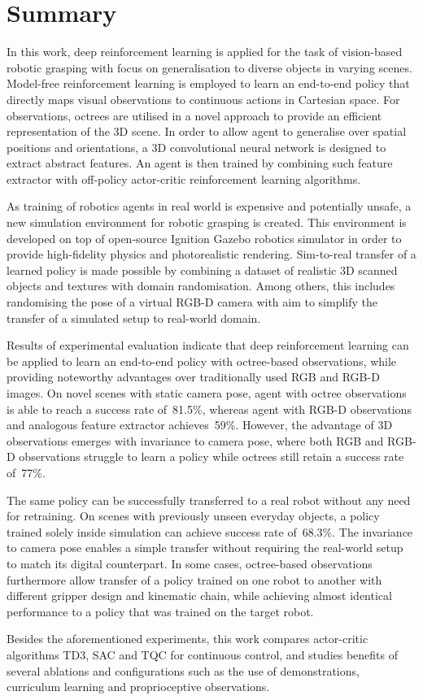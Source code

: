 \chapter*{Summary}

In this work, deep reinforcement learning is applied for the task of vision-based robotic grasping with focus on generalisation to diverse objects in varying scenes. Model-free reinforcement learning is employed to learn an end-to-end policy that directly maps visual observations to continuous actions in Cartesian space. For observations, octrees are utilised in a novel approach to provide an efficient representation of the 3D scene. In order to allow agent to generalise over spatial positions and orientations, a 3D convolutional neural network is designed to extract abstract features. An agent is then trained by combining such feature extractor with off-policy actor-critic reinforcement learning algorithms.

As training of robotics agents in real world is expensive and potentially unsafe, a new simulation environment for robotic grasping is created. This environment is developed on top of open-source Ignition Gazebo robotics simulator in order to provide high-fidelity physics and photorealistic rendering. Sim-to-real transfer of a learned policy is made possible by combining a dataset of realistic 3D scanned objects and textures with domain randomisation. Among others, this includes randomising the pose of a virtual RGB-D camera with aim to simplify the transfer of a simulated setup to real-world domain.

Results of experimental evaluation indicate that deep reinforcement learning can be applied to learn an end-to-end policy with octree-based observations, while providing noteworthy advantages over traditionally used RGB and RGB-D images. On novel scenes with static camera pose, agent with octree observations is able to reach a success rate of~81.5\%, whereas agent with RGB-D observations and analogous feature extractor achieves~59\%. However, the advantage of 3D observations emerges with invariance to camera pose, where both RGB and RGB-D observations struggle to learn a policy while octrees still retain a success rate of~77\%.

The same policy can be successfully transferred to a real robot without any need for retraining. On scenes with previously unseen everyday objects, a policy trained solely inside simulation can achieve success rate of~68.3\%. The invariance to camera pose enables a simple transfer without requiring the real-world setup to match its digital counterpart. In some cases, octree-based observations furthermore allow transfer of a policy trained on one robot to another with different gripper design and kinematic chain, while achieving almost identical performance to a policy that was trained on the target robot.

Besides the aforementioned experiments, this work compares actor-critic algorithms TD3, SAC and TQC for continuous control, and studies benefits of several ablations and configurations such as the use of demonstrations, curriculum learning and proprioceptive observations.
